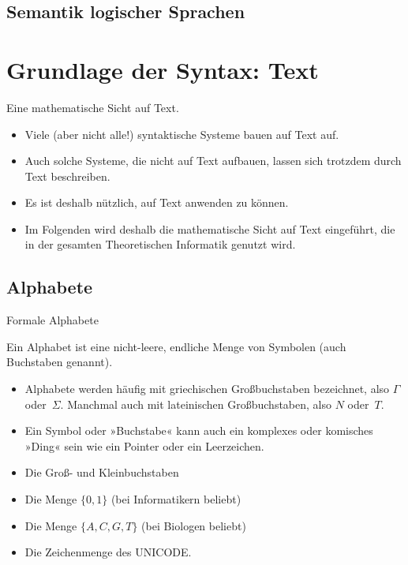 \subsection[Semantik\protect\\ logischer Sprachen]{Semantik logischer Sprachen}




\section{Grundlage der Syntax: Text}

\begin{frame}{Eine mathematische Sicht auf Text.}
  \begin{itemize}
  \item Viele (aber nicht alle!) syntaktische Systeme bauen auf
    \alert{Text} auf.
  \item Auch solche Systeme, die nicht auf Text aufbauen, lassen sich
    trotzdem durch Text beschreiben. 
  \item Es ist deshalb nützlich, auf Text  anwenden zu können.
  \item Im Folgenden wird deshalb die \alert{mathematische Sicht} auf
    Text eingeführt, die \alert{in der gesamten Theoretischen
      Informatik} genutzt wird.
  \end{itemize}  
\end{frame}


\subsection{Alphabete}

\begin{frame}{Formale Alphabete}
  \begin{definition}[Alphabet]
    Ein \alert{Alphabet} ist eine nicht-leere, endliche Menge von
    \alert{Symbolen} (auch \alert{Buchstaben} genannt). 
  \end{definition}
  
  \begin{itemize}
  \item Alphabete werden häufig mit griechischen Großbuchstaben
    bezeichnet, also $\Gamma$ oder~$\Sigma$. Manchmal auch mit
    lateinischen Großbuchstaben, also $N$ oder~$T$.
  \item Ein Symbol oder »Buchstabe« kann auch ein komplexes oder
    komisches »Ding« sein wie ein Pointer oder ein Leerzeichen.
  \end{itemize}

  \begin{examples}
    \begin{itemize}
    \item Die Groß- und Kleinbuchstaben
    \item Die Menge $\{0,1\}$ (bei Informatikern beliebt)
    \item Die Menge $\{A,C,G,T\}$ (bei Biologen beliebt)
    \item Die Zeichenmenge des UNICODE.
    \end{itemize}
  \end{examples}
\end{frame}


